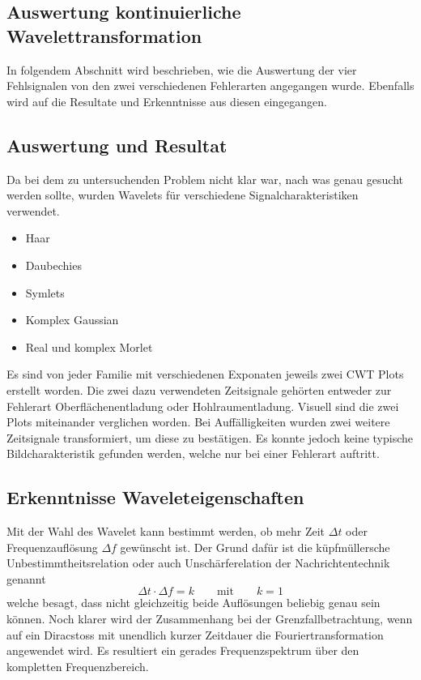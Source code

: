 \begin{refsection}
\section{Auswertung kontinuierliche Wavelettransformation}
In folgendem Abschnitt wird beschrieben, wie die Auswertung der vier Fehlsignalen von den zwei verschiedenen Fehlerarten angegangen wurde. 
Ebenfalls wird auf die Resultate und Erkenntnisse aus diesen eingegangen.
\subsection{Auswertung und Resultat}
Da bei dem zu untersuchenden Problem nicht klar war, nach was genau gesucht werden sollte, wurden Wavelets für verschiedene Signalcharakteristiken verwendet.
\begin{itemize}
	\item Haar
	\item Daubechies 
	\item Symlets
	\item Komplex Gaussian
	\item Real und komplex Morlet
\end{itemize}
Es sind von jeder Familie mit verschiedenen Exponaten jeweils zwei CWT Plots erstellt worden. 
Die zwei dazu verwendeten Zeitsignale gehörten entweder zur Fehlerart Oberflächenentladung oder Hohlraumentladung.
Visuell sind die zwei Plots miteinander verglichen worden.
Bei Auffälligkeiten wurden zwei weitere Zeitsignale transformiert, um diese zu bestätigen.
Es konnte jedoch keine typische Bildcharakteristik gefunden werden, welche nur bei einer Fehlerart auftritt.

\subsection{Erkenntnisse Waveleteigenschaften}
Mit der Wahl des Wavelet kann bestimmt werden, ob mehr Zeit $\Delta t$ oder Frequenzauflösung $\Delta f$ gewünscht ist. 
Der Grund dafür ist die küpfmüllersche Unbestimmtheitsrelation oder auch Unschärferelation der Nachrichtentechnik genannt
\begin{equation}
\Delta t \cdot \Delta f = k
\qquad\text{mit}\qquad
k = 1
\end{equation}
welche besagt, dass nicht gleichzeitig beide Auflösungen beliebig genau sein können.
Noch klarer wird der Zusammenhang bei der Grenzfallbetrachtung, wenn auf ein Diracstoss mit unendlich kurzer Zeitdauer die Fouriertransformation angewendet wird.
Es resultiert ein gerades Frequenzspektrum über den kompletten Frequenzbereich.


\end{refsection}
